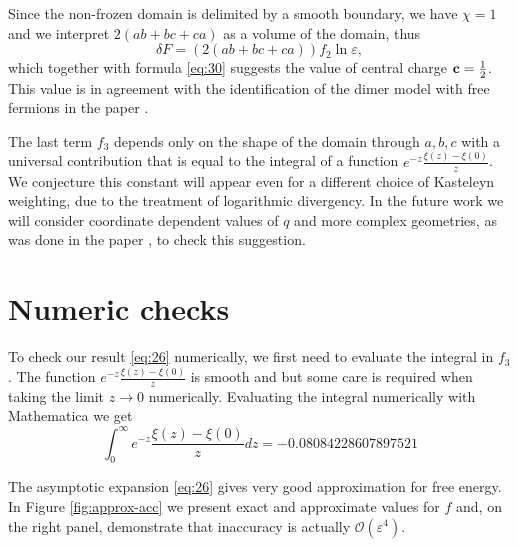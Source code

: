 \documentclass{article}
\begin{document}
Since the non-frozen domain is delimited by a smooth boundary, we have $\chi=1$ and we interpret
$2(ab+bc+ca)$ as a volume of the domain, thus
\begin{equation}
  \label{eq:33}
  \delta F = \left(2(ab+bc+ca)\right) f_{2}\ln\varepsilon,
\end{equation}
which together with formula \eqref{eq:30} suggests the value of central charge
${\bf c}=\frac{1}{2}$. This value is in agreement with the identification of the dimer model with
free fermions in the paper \cite{dijkgraaf2009dimer}.

The last term $f_{3}$ depends only on the shape of the domain through $a,b,c$ with a universal
contribution that is equal to the integral of a function $e^{-z}\frac{\xi(z)-\xi(0)}{z}$. We conjecture
this constant will appear even for a different choice of Kasteleyn weighting, due to the treatment
of logarithmic divergency. In the future work we will consider coordinate dependent values of $q$
and more complex geometries, as was done in the paper \cite{okounkov2007random}, to check this
suggestion.

\section{Numeric checks}
\label{sec:numeric-checks}
To check our result \eqref{eq:26} numerically, we first need to evaluate the integral in $f_{3}$.
The function $e^{-z}\frac{\xi(z)-\xi(0)}{z}$ is smooth and but some care is required when taking the
limit $z\to 0$ numerically. Evaluating the integral numerically with Mathematica we get
\begin{equation}
  \label{eq:2}
  \int_{0}^{\infty}e^{-z}\frac{\xi(z)-\xi(0)}{z} dz = -0.08084228607897521
\end{equation}

The asymptotic expansion \eqref{eq:26} gives very good approximation for free energy. In Figure
\ref{fig:approx-acc} we present exact and approximate values for $f$ and, on the right panel,
demonstrate that inaccuracy is actually $\mathcal{O}(\varepsilon^{4})$. 
\end{document}
